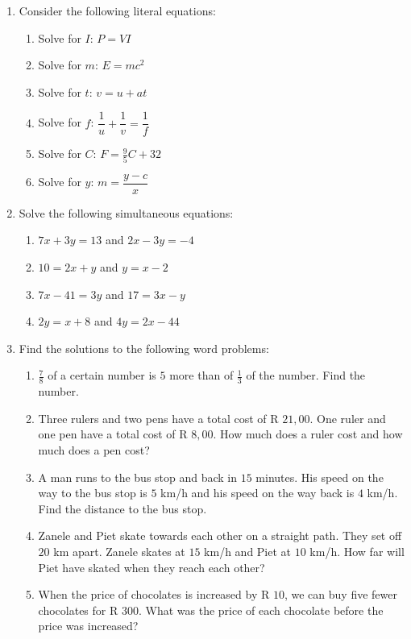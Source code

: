 \begin{eocexercises}{}
\begin{enumerate}[itemsep=5pt, label=\textbf{\arabic*}. ]
\item Consider the following literal equations:
\begin{enumerate}[itemsep=6pt,label=\textbf{(\alph*)}]
\item Solve for $I$: $P = VI$
\item Solve for $m$: $E=mc^{2}$
\item Solve for $t$: $v = u + at$
\item Solve for $f$: $\dfrac{1}{u} + \dfrac{1}{v} = \dfrac{1}{f}$
\item Solve for $C$: $F=\frac{9}{5}C + 32$
\item Solve for $y$: $m = \dfrac{y-c}{x}$
\end{enumerate}
\item Solve the following simultaneous equations:
\begin{enumerate}[itemsep=5pt,label=\textbf{(\alph*)}]
\item $7x+3y=13$ and $2x-3y=-4$  
\item $10=2x+y$ and $y=x-2$
\item $7x-41=3y$ and $17=3x-y$
\item $2y=x+8$ and $4y=2x-44$
\end{enumerate}
\item Find the solutions to the following word problems:
\begin{enumerate}[itemsep=5pt,label=\textbf{(\alph*)}]
\item $\frac{7}{8}$ of a certain number is $5$ more than of $\frac{1}{3}$ of the number. Find the number.
\item Three rulers and two pens have a total cost of R $21,00$. One ruler and one pen have a total cost of R $8,00$. How much does a ruler cost and how much does a pen cost? 
\item A man runs to the bus stop and back in $15$ minutes. His speed on the way to the bus stop is $5$ km/h and his speed on the way back is $4$ km/h. Find the distance to the bus stop.
\item Zanele and Piet skate towards each other on a straight path. They set off $20$ km apart. Zanele skates at $15$ km/h and Piet at $10$ km/h. How far will Piet have skated when they reach each other?
\item When the price of chocolates is increased by R $10$, we can buy five fewer chocolates for R $300$. What was the price of each chocolate before the price was increased?
\end{enumerate}
\end{enumerate}

\end{eocexercises}


